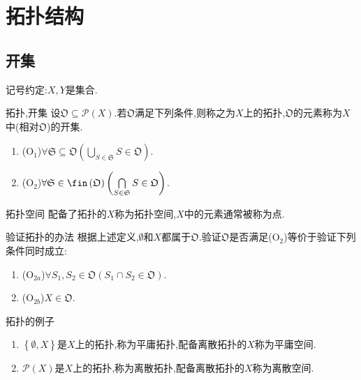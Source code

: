 \chapter{拓扑结构}

\section{开集}

记号约定:$X,Y$是集合.

\begin{definition}{拓扑,开集}{}
	设$\mathfrak{O}\subseteq\mathcal{P}\left(X\right)$.若$\mathfrak{O}$满足下列条件,则称之为$X$上的拓扑,$\mathfrak{O}$的元素称为$X$中(相对$\mathfrak{O}$)的开集.
	\begin{enumerate}
		\item ($\mathrm{O}_{1}$)$\forall\mathfrak{S}\subseteq\mathfrak{O}\left(\bigcup\limits_{S\in\mathfrak{S}}S\in\mathfrak{O}\right)$.
		\item ($\mathrm{O}_{2}$)$\forall\mathfrak{S}\in\fin\left(\mathfrak{O}\right)\left(\bigcap\limits_{S\in\mathfrak{S}}S\in\mathfrak{O}\right)$.
	\end{enumerate}
\end{definition}

\begin{definition}{拓扑空间}{}
	配备了拓扑的$X$称为拓扑空间,$X$中的元素通常被称为点.
\end{definition}

\begin{remark}{验证拓扑的办法}{}
	根据上述定义,$\emptyset$和$X$都属于$\mathfrak{O}$.验证$\mathfrak{O}$是否满足($\mathrm{O}_{2}$)等价于验证下列条件同时成立:
	\begin{enumerate}
		\item ($\mathrm{O}_{2a}$)$\forall S_{1},S_{2}\in\mathfrak{O}\left(S_{1}\cap S_{2}\in\mathfrak{O}\right)$.
		\item ($\mathrm{O}_{2b}$)$X\in\mathfrak{O}$.
	\end{enumerate}
\end{remark}

\begin{example}{拓扑的例子}{}
	\begin{enumerate}
		\item $\left\{\emptyset,X\right\}$是$X$上的拓扑,称为平庸拓扑,配备离散拓扑的$X$称为平庸空间.
		\item $\mathcal{P}\left(X\right)$是$X$上的拓扑,称为离散拓扑,配备离散拓扑的$X$称为离散空间.
	\end{enumerate}
\end{example}

